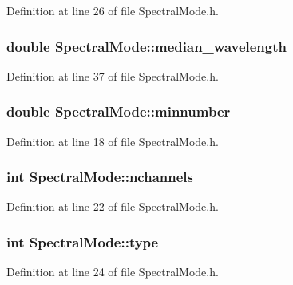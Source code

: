 Definition at line 26 of file SpectralMode.h.

\hypertarget{classSpectralMode_a8c817cc0d2f5d57823a03256743260b3}{
\subsubsection[{median\_\-wavelength}]{\setlength{\rightskip}{0pt plus 5cm}double {\bf SpectralMode::median\_\-wavelength}}}
\label{classSpectralMode_a8c817cc0d2f5d57823a03256743260b3}


Definition at line 37 of file SpectralMode.h.

\hypertarget{classSpectralMode_a702eb517e9b821c6fc6508fa6b96579c}{
\subsubsection[{minnumber}]{\setlength{\rightskip}{0pt plus 5cm}double {\bf SpectralMode::minnumber}}}
\label{classSpectralMode_a702eb517e9b821c6fc6508fa6b96579c}


Definition at line 18 of file SpectralMode.h.

\hypertarget{classSpectralMode_a7c68010a64d612a452df276003689eca}{
\subsubsection[{nchannels}]{\setlength{\rightskip}{0pt plus 5cm}int {\bf SpectralMode::nchannels}}}
\label{classSpectralMode_a7c68010a64d612a452df276003689eca}


Definition at line 22 of file SpectralMode.h.

\hypertarget{classSpectralMode_a7720aa3a3f0d28c755169f86a3125d58}{
\subsubsection[{type}]{\setlength{\rightskip}{0pt plus 5cm}int {\bf SpectralMode::type}}}
\label{classSpectralMode_a7720aa3a3f0d28c755169f86a3125d58}


Definition at line 24 of file SpectralMode.h.

